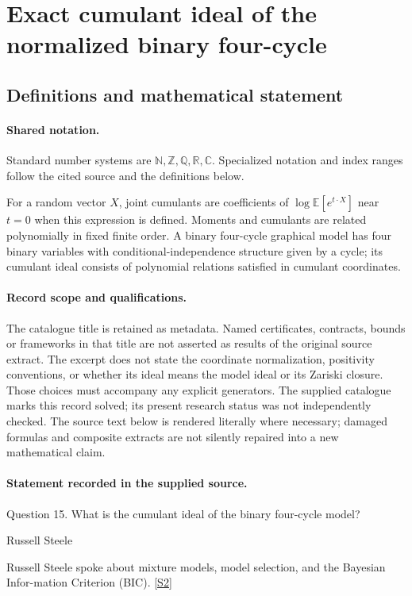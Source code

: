 \documentclass[11pt]{article}
\newcommand{\sref}[2]{\hyperlink{source:#1:#2}{[S#2]}}
\begin{document}
\section{Exact cumulant ideal of the normalized binary four-cycle}\label{statement}

\subsection{Definitions and mathematical statement}

\paragraph{Shared notation.}Standard number systems are $\mathbb N,\mathbb Z,\mathbb Q,\mathbb R,\mathbb C$. Specialized notation and index ranges follow the cited source and the definitions below.


For a random vector $X$, joint cumulants are coefficients of $\log\mathbb E[e^{t\cdot X}]$ near $t=0$ when this expression is defined. Moments and cumulants are related polynomially in fixed finite order. A binary four-cycle graphical model has four binary variables with conditional-independence structure given by a cycle; its cumulant ideal consists of polynomial relations satisfied in cumulant coordinates.
\paragraph{Record scope and qualifications.}
The catalogue title is retained as metadata. Named certificates, contracts, bounds or frameworks in that title are not asserted as results of the original source extract.
The excerpt does not state the coordinate normalization, positivity conventions, or whether its ideal means the model ideal or its Zariski closure. Those choices must accompany any explicit generators. The supplied catalogue marks this record solved; its present research status was not independently checked.
The source text below is rendered literally where necessary; damaged formulas and composite extracts are not silently repaired into a new mathematical claim.
\paragraph{Statement recorded in the supplied source.}
Question 15. What is the cumulant ideal of the binary four-cycle model?

Russell Steele

Russell Steele spoke about mixture models, model selection, and the Bayesian Infor-mation Criterion (BIC). \sref{statement}{2}
\end{document}
